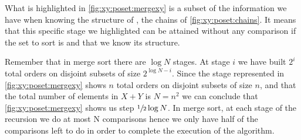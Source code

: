 What is highlighted in \ref{fig:xy:poset:mergexy} is a subset of the
information we have when knowing the structure of \XY, \ie the chains of
\ref{fig:xy:poset:chains}. It means that this specific stage we
highlighted can be attained without any comparison if the set to sort is \XY
and that we know its structure.

Remember that in merge sort there are $\log N$ stages. At stage $i$ we have
built $2^{i}$ total orders on disjoint subsets of size $2^{\log N - i}$. Since
the stage represented in \ref{fig:xy:poset:mergexy} shows $n$ total orders on
disjoint subsets of size $n$, and that the total number of elements in $X+Y$ is
$N = n^2$ we can conclude that \ref{fig:xy:poset:mergexy} shows us step
$\sfrac{1}{2} \log N$. In merge sort, at each stage of the recursion we do at
most N comparisons hence we only have half of the comparisons left to do in
order to complete the execution of the algorithm.
